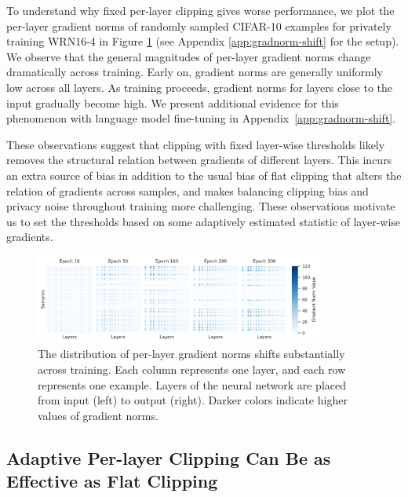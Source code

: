 To understand why fixed per-layer clipping gives worse performance, we plot the per-layer gradient norms of randomly sampled CIFAR-10 examples for privately training WRN16-4 in Figure \ref{fig:grad-norm-cifar10} (see Appendix \ref{app:gradnorm-shift} for the setup). 
We observe that the general magnitudes of per-layer gradient norms change dramatically across training. 
Early on, gradient norms are generally uniformly low across all layers. 
As training proceeds, gradient norms for layers close to the input gradually become high. 
We present additional evidence for this phenomenon with language model fine-tuning in Appendix~\ref{app:gradnorm-shift}. 

These observations suggest that clipping with fixed layer-wise thresholds likely removes the structural relation between gradients of different layers. 
This incurs an extra source of bias in addition to the usual bias of flat clipping that alters the relation of gradients across samples, and makes balancing clipping bias and privacy noise throughout training more challenging. 
These observations motivate us to set the thresholds based on some adaptively estimated statistic of layer-wise gradients. 

\begin{figure}[ht]
\centering
\includegraphics[width=0.85\textwidth]{files/fig/persample_perlayer_norm_cifar.pdf}
\caption{The distribution of per-layer gradient norms shifts substantially across training. Each column represents one layer, and each row represents  one example. 
Layers of the neural network are placed from input (left) to output (right). 
Darker colors indicate higher values of gradient norms. 
}
\label{fig:grad-norm-cifar10}
\end{figure}

\subsection{Adaptive Per-layer Clipping Can Be as Effective as Flat Clipping}
\label{sec:adaptive-clipping}

